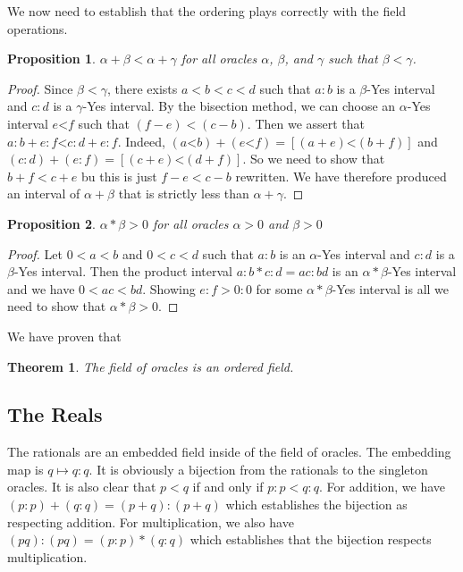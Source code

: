 \documentclass[12pt]{article}
\newtheorem{theorem}{Theorem}
\newtheorem{proposition}{Proposition}
\theoremstyle{remark}
\newcommand{\lt}{\mathord{<}}
\begin{document}
We now need to establish that the ordering plays correctly with the field operations. 

\begin{proposition}\label{pr:addinq}
 $\alpha + \beta < \alpha + \gamma$ for all oracles $\alpha$, $\beta$, and $\gamma$ such that $\beta < \gamma$.
\end{proposition}

\begin{proof}
Since $\beta < \gamma$, there exists $a<b<c<d$ such that $a:b$ is a $\beta$-Yes interval and $c:d$ is a $\gamma$-Yes interval. By the bisection method, we can choose an $\alpha$-Yes interval $e\lt f$ such that $ (f-e) <  (c-b)$. Then we assert that $a:b+e:f \lt  c:d+e:f$. Indeed, $(a\lt b)+(e\lt f) = [(a+e)\lt (b+f)]$ and $(c:d)+(e:f) = [(c+e)\lt (d+f)]$. So we need to show that $b+f< c+e$ bu this is just $f-e < c-b$ rewritten. We have therefore produced an interval of $\alpha+\beta$ that is strictly less than $\alpha+\gamma$. 
\end{proof}


\begin{proposition}
$\alpha*\beta > 0$ for all oracles $\alpha>0$ and $\beta>0$ 
\end{proposition}

\begin{proof}
Let $0 < a < b$ and $0<c<d$ such that $a:b$ is an $\alpha$-Yes interval and $c:d$ is a $\beta$-Yes interval. Then the product interval $a:b*c:d = ac:bd$ is an $\alpha*\beta$-Yes interval and we have $0 < ac < bd$. Showing $e:f > 0:0$ for some $\alpha*\beta$-Yes interval is all we need to show that $\alpha*\beta > 0$.  
\end{proof}

We have proven that

\begin{theorem}
The field of oracles is an ordered field.
\end{theorem}

\subsection{The Reals}

The rationals are an embedded field inside of the field of oracles. The embedding map is $q \mapsto q:q$. It is obviously a bijection from the rationals to the singleton oracles. It is also clear that $p<q$ if and only if $p:p < q:q$. For addition, we have $(p:p) + (q:q) = (p+q):(p+q)$ which establishes the bijection as respecting addition. For multiplication, we also have $(pq):(pq) = (p:p)*(q:q)$ which establishes that the bijection respects multiplication. 
\end{document}
